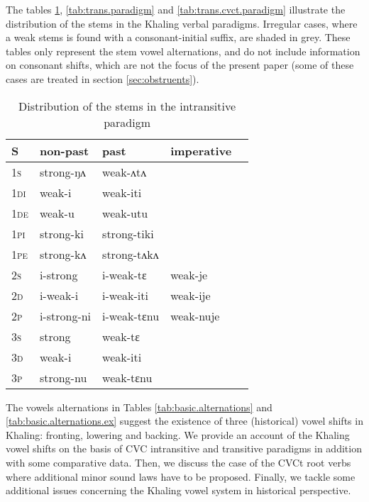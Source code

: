 \documentclass[oldfontcommands,oneside,a4paper,11pt]{article}
\newcommand{\ipa}[1]{{\phon \mbox{#1}}} %
\newcommand{\grise}[1]{\cellcolor{lightgray}\textbf{#1}}
\begin{document}
The tables \ref{tab:intrans.paradigm}, \ref{tab:trans.paradigm} and  \ref{tab:trans.cvct.paradigm} illustrate the distribution of the stems in the Khaling verbal paradigms. Irregular cases, where a weak stems is found with a consonant-initial suffix, are shaded in grey. These tables only represent   the stem vowel alternations, and do not include information on   consonant shifts, which are not the focus of the present paper (some of these cases are treated in section \ref{sec:obstruents}).

\begin{table}[H]
\caption{Distribution of the stems in the intransitive paradigm } \label{tab:intrans.paradigm} \centering
\begin{tabular}{lllll}
\toprule
S & non-past & past & imperative\\
\midrule
\textsc{1s} & strong-\ipa{ŋʌ} & weak-\ipa{ʌtʌ} \\
\textsc{1di} & weak-\ipa{i} & weak-\ipa{iti} \\
\textsc{1de} & weak-\ipa{u} & weak-\ipa{utu} \\
\textsc{1pi} & strong-\ipa{ki} & strong-\ipa{tiki} \\
\textsc{1pe} & strong-\ipa{kʌ} & strong-\ipa{tʌkʌ} \\
\textsc{2s} & \ipa{i}-strong & \ipa{i}-weak-\ipa{tɛ} \grise{} &weak-\ipa{je}\grise{}\\
\textsc{2d} & \ipa{i}-weak-\ipa{i} & \ipa{i}-weak-\ipa{iti} &weak-\ipa{ije} \\
\textsc{2p} & \ipa{i}-strong-\ipa{ni} & \ipa{i}-weak-\ipa{tɛnu}\grise{} &weak-\ipa{nuje}\grise{}\\
\textsc{3s} & strong & weak-\ipa{tɛ} \grise{}\\
\textsc{3d} & weak-\ipa{i} & weak-\ipa{iti} \\
\textsc{3p} & strong-\ipa{nu} & weak-\ipa{tɛnu}\grise{} \\
\bottomrule
\end{tabular}
\end{table}

The vowels alternations in Tables \ref{tab:basic.alternations} and \ref{tab:basic.alternations.ex} suggest the existence of   three (historical) vowel shifts   in Khaling: fronting, lowering and backing. We provide an account of the Khaling vowel shifts on the basis of CVC intransitive and transitive paradigms in addition with some comparative data. Then, we discuss the case of the CVCt root verbs where additional minor sound laws have to be proposed. Finally, we tackle some additional issues concerning the Khaling vowel system in historical perspective.
\end{document}
